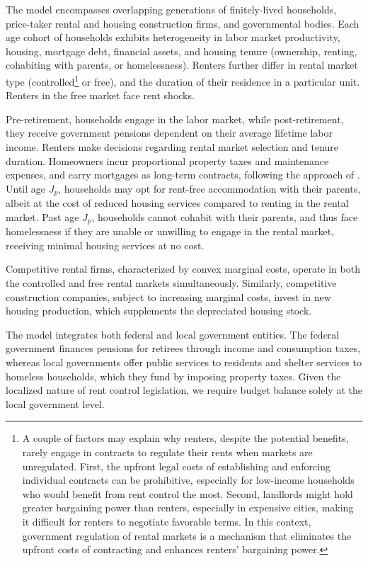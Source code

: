 \documentclass[parskip=full]{article}
\begin{document}
The model encompasses overlapping generations of finitely-lived households, price-taker rental and housing construction firms, and governmental bodies. Each age cohort of households exhibits heterogeneity in labor market productivity, housing, mortgage debt, financial assets, and housing tenure (ownership, renting, cohabiting with parents, or homelessness). Renters further differ in rental market type (controlled\footnote{A couple of factors may explain why renters, despite the potential benefits, rarely engage in contracts to regulate their rents when markets are unregulated. First, the upfront legal costs of establishing and enforcing individual contracts can be prohibitive, especially for low-income households who would benefit from rent control the most. Second, landlords might hold greater bargaining power than renters, especially in expensive cities, making it difficult for renters to negotiate favorable terms. In this context, government regulation of rental markets is a mechanism that eliminates the upfront costs of contracting and enhances renters' bargaining power.} or free), and the duration of their residence in a particular unit. Renters in the free market face rent shocks.

Pre-retirement, households engage in the labor market, while post-retirement, they receive government pensions dependent on their average lifetime labor income. Renters make decisions regarding rental market selection and tenure duration. Homeowners incur proportional property taxes and maintenance expenses, and carry mortgages as long-term contracts, following the approach of \citet{kkk-2021}. Until age $J_{p}$, households may opt for rent-free accommodation with their parents, albeit at the cost of reduced housing services compared to renting in the rental market. Past age $J_{p}$, households cannot cohabit with their parents, and thus face homelessness if they are unable or unwilling to engage in the rental market, receiving minimal housing services at no cost.

Competitive rental firms, characterized by convex marginal costs, operate in both the controlled and free rental markets simultaneously. Similarly, competitive construction companies, subject to increasing marginal costs, invest in new housing production, which supplements the depreciated housing stock.

The model integrates both federal and local government entities. The federal government finances pensions for retirees through income and consumption taxes, whereas local governments offer public services to residents and shelter services to homeless households, which they fund by imposing property taxes. Given the localized nature of rent control legislation, we require budget balance solely at the local government level.
\end{document}
